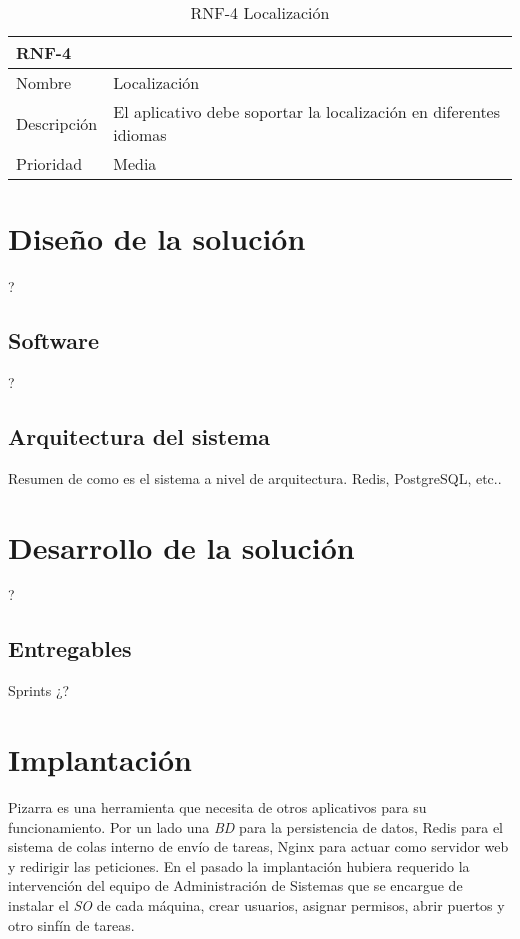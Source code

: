 \documentclass[11pt,spanish,listoffigures,listoftables]{tfgetsinf}
\begin{document}
\begin{table}
	\centering
	\begin{tabular}{ |p{4cm}||p{10cm}|  }
		\multicolumn{2}{l}{\textbf{RNF-4}} \\
		\hline
		Nombre   & Localización \\
		\hline
		Descripción  & El aplicativo debe soportar la localización en diferentes idiomas \\
		\hline
		Prioridad &  Media \\
		\hline
	\end{tabular}
	\caption{RNF-4 Localización}
	\label{table:27}
\end{table}



\chapter{Diseño de la solución}

?

\section{Software}

?

\section{Arquitectura del sistema}

Resumen de como es el sistema a nivel de arquitectura. Redis, PostgreSQL, etc..



\chapter{Desarrollo de la solución}

?

\section{Entregables}

Sprints ¿?

\chapter{Implantación}

Pizarra es una herramienta que necesita de otros aplicativos para su funcionamiento. Por un lado una \textit{BD} para la persistencia de datos, Redis para el sistema de colas interno de envío de tareas, Nginx para actuar como servidor web y redirigir las peticiones. En el pasado la implantación hubiera requerido la intervención del equipo de Administración de Sistemas que se encargue de instalar el \textit{SO} de cada máquina, crear usuarios, asignar permisos, abrir puertos y otro sinfín de tareas.
\end{document}
